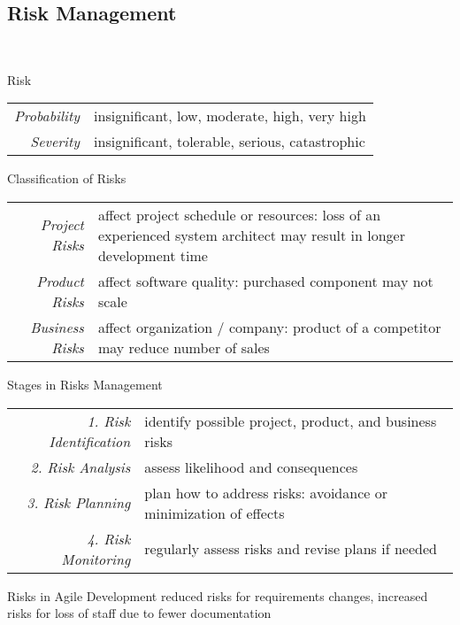 \subsection{Risk Management}
\begin{frame}{\insertsubsection\ \mytitlesource{\sommerville}}
	\begin{fancycolumns}
		\begin{definition}{Risk}
			\setlength\tabcolsep{1mm}
			\begin{tabularx}{\textwidth}{rX}				
				\emph{Probability} & insignificant, low, moderate, high, very high\\
				\emph{Severity} & insignificant, tolerable, serious, catastrophic
			\end{tabularx}
		\end{definition}
		\pause
		\setlength\tabcolsep{1mm}
		\begin{note}{Classification of Risks}
			\begin{tabularx}{\textwidth}{rX}				
				\emph{Project Risks} & affect project schedule or resources: loss of an experienced system architect may result in longer development time\\
				\emph{Product Risks} & affect software quality: purchased component may not scale\\
				\emph{Business Risks} & affect organization / company: product of a competitor may reduce number of sales
			\end{tabularx}
		\end{note}
		\nextcolumn
		\pause
		\begin{definition}{Stages in Risks Management}
			\setlength\tabcolsep{1mm}
			\begin{tabularx}{\textwidth}{rX}				
				\emph{1. Risk Identification} & identify possible project, product, and business risks\\
				\emph{2. Risk Analysis} & assess likelihood and consequences\\
				\emph{3. Risk Planning} & plan how to address risks: avoidance or minimization of effects\\
				\emph{4. Risk Monitoring} & regularly assess risks and revise plans if needed
			\end{tabularx}
		\end{definition}
		\pause
		\begin{example}{Risks in Agile Development}
			reduced risks for requirements changes, increased risks for loss of staff due to fewer documentation
		\end{example}
	\end{fancycolumns}
\end{frame}

